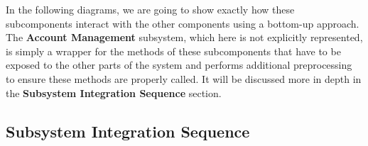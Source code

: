 In the following diagrams, we are going to show exactly how these subcomponents interact with the other components using a bottom-up approach. The \textbf{Account Management} subsystem, which here is not explicitly represented, is simply a wrapper for the methods of these subcomponents that have to be exposed to the other parts of the system and performs additional preprocessing to ensure these methods are properly called. It will be discussed more in depth in the \textbf{Subsystem Integration Sequence} section.
\begin{figure}[H]
\centering
{}
\end{figure}
\begin{figure}[H]
\centering
{}
\end{figure}
\begin{figure}[H]
\centering
{}
\end{figure}
\begin{figure}[H]
\centering
{}
\end{figure}
\subsection{Subsystem Integration Sequence}